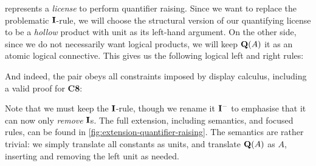 represents a \emph{license} to perform quantifier raising. Since we
want to replace the problematic $\I$-rule, we will choose the
structural version of our quantifying license to be a \emph{hollow}
product with unit as its left-hand argument.
On the other side, since we do not necessarily want logical products,
we will keep $\q[A]$ it as an atomic logical connective. This gives us
the following logical left and right rules:
\begin{center}
  \begin{pfbox}
  \end{pfbox}
  \begin{pfbox}
  \end{pfbox}
\end{center}
And indeed, the pair obeys all constraints imposed by display
calculus, including a valid proof for \textbf{C8}:
\begin{pfblock}
\end{pfblock}
Note that we must keep the $\I$-rule, though we rename it $\I^-$ to
emphasise that it can now only \emph{remove} $\I$s. The full
extension, including semantics, and focused rules, can be found in
\autoref{fig:extension-quantifier-raising}. The semantics are rather
trivial: we simply translate all constants as units, and translate
$\q[A]$ as $A$, inserting and removing the left unit as needed.



